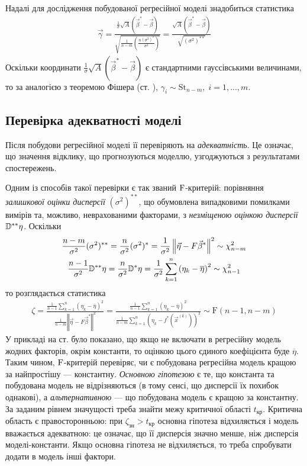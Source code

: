 Надалі для дослідження побудованої регресійної моделі знадобиться статистика
\begin{gather*}
    \vec{\gamma} = \frac{
        \frac{1}{\sigma} \sqrt{A}(\vec{\beta}^* - \vec{\beta})
    }{
        \sqrt{\frac{1}{n-m} \left(\frac{n (\sigma^2)^*}{\sigma^2}\right)}
    } = \frac{\sqrt{A}(\vec{\beta}^* - \vec{\beta})}{\sqrt{(\sigma^2)^{**}}}
\end{gather*}
Оскільки координати $\frac{1}{\sigma} \sqrt{A}(\vec{\beta}^* - \vec{\beta})$ є стандартними гауссівськими величинами,
то за аналогією з теоремою Фішера (ст. \pageref{Fisher_th}), $\gamma_i \sim \mathrm{St}_{n-m}, \; i = 1,..., m$.

\subsection{Перевірка адекватності моделі}
Після побудови регресійної моделі її перевіряють на \emph{адекватність}.
Це означає, що значення відклику, що прогнозуються моделлю, узгоджуються з результатами спостережень.

Одним із способів такої перевірки є так званий $\rm F$-критерій: порівняння \emph{залишкової оцінки дисперсії} $(\sigma^2)^{**}$, що обумовлена
випадковими помилками вимірів та, можливо, неврахованими факторами, з 
\emph{незміщеною оцінкою дисперсії} $\mathbb{D}^{**}\eta$. Оскільки
\begin{gather*}
    \frac{n-m}{\sigma^2} (\sigma^2)^{**}= 
    \frac{n}{\sigma^2}(\sigma^2)^* = \frac{1}{\sigma^2} \left\Vert \vec{\eta} - F \vec{\beta}^*\right\Vert^2 \sim \chi^2_{n-m} \\
    \frac{n-1}{\sigma^2} \mathbb{D}^{**}\eta = \frac{n}{\sigma^2} \mathbb{D}^* \eta = \frac{1}{\sigma^2} \sum\limits_{k=1}^n \left(\eta_k - \overline{\eta}\right)^2 \sim \chi^2_{n-1}
\end{gather*}
то розглядається статистика
\begin{gather}\label{f_test}
    \zeta = \frac{
        \frac{1}{n-1} \sum\limits_{k=1}^n \left(\eta_k - \overline{\eta}\right)^2
    }{
        \frac{1}{n-m} \left\Vert \vec{\eta} - F \vec{\beta}^*\right\Vert^2
    } = 
    \frac{
        \frac{1}{n-1} \sum\limits_{k=1}^n \left(\eta_k - \overline{\eta}\right)^2
    }{
        \frac{1}{n-m} \sum\limits_{k=1}^n \left(\eta_k - f^*\left(\vec{x}^{(k)}\right)\right)^2
    } \sim \mathrm{F}(n-1, n-m)
\end{gather}
У прикладі на ст. \pageref{intercept_fit} було показано, що якщо не включати
в регресійну модель жодних факторів, окрім константи, то оцінкою цього єдиного коефіцієнта буде $\overline{\eta}$.
Таким чином, $\rm F$-критерій перевіряє, чи є побудована регресійна модель кращою за найпростішу --- константну.
\emph{Основною гіпотезою} є те, що константа та побудована модель не відрізняються (в тому сенсі, що дисперсії їх похибок однакові),
а \emph{альтернативною} --- що побудована модель є кращою за константну.
За заданим рівнем значущості треба знайти межу критичної області
$t_\text{кр}$. Критична область є правосторонньою: при $\zeta_\text{зн} > t_\text{кр}$ основна гіпотеза відхиляється і
модель вважається адекватною: це означає, що її дисперсія значно менше, ніж дисперсія моделі-константи.
Якщо основна гіпотеза не відхиляється, то треба спробувати додати в модель інші фактори.

